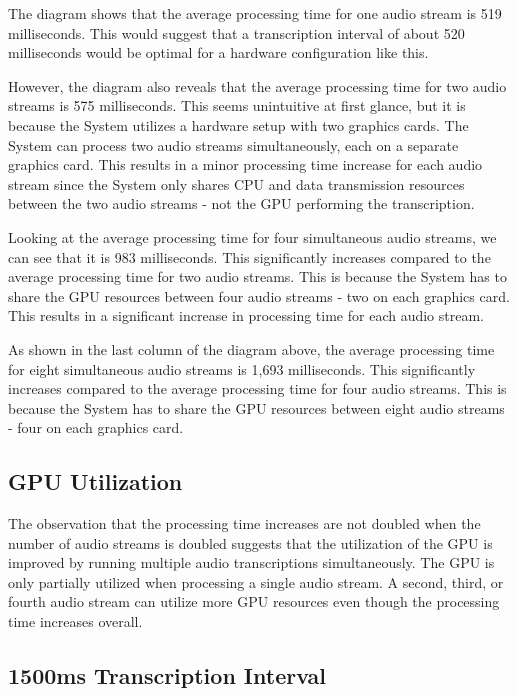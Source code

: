 The diagram shows that the average processing time for one audio stream is 519 milliseconds. This would suggest that a 
transcription interval of about 520 milliseconds would be optimal for a hardware configuration like this. 

However, the diagram also reveals that the average processing time for two audio streams is 575 milliseconds. This 
seems unintuitive at first glance, but it is because the System utilizes a hardware setup with two graphics cards. 
The System can process two audio streams simultaneously, each on a separate graphics card. This results in a minor 
processing time increase for each audio stream since the System only shares CPU and data transmission resources between 
the two audio streams - not the GPU performing the transcription.

Looking at the average processing time for four simultaneous audio streams, we can see that it is 983 milliseconds. 
This significantly increases compared to the average processing time for two audio streams. This is because the System 
has to share the GPU resources between four audio streams - two on each graphics card. This results in a significant 
increase in processing time for each audio stream.

As shown in the last column of the diagram above, the average processing time for eight simultaneous audio streams is 
1,693 milliseconds. This significantly increases compared to the average processing time for four audio streams. 
This is because the System has to share the GPU resources between eight audio streams - four on each graphics card. 

\subsection{GPU Utilization}

The observation that the processing time increases are not doubled when the number of audio streams is doubled suggests 
that the utilization of the GPU is improved by running multiple audio transcriptions simultaneously. The GPU is only 
partially utilized when processing a single audio stream. A second, third, or fourth audio stream can utilize more GPU 
resources even though the processing time increases overall.

\subsection{1500ms Transcription Interval}


